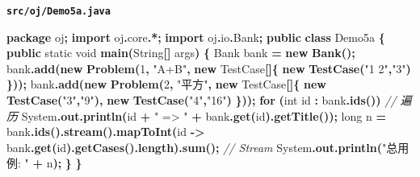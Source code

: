 \documentclass[
  11pt,
]{ctexart}
\newenvironment{Shaded}{\begin{snugshade}}{\end{snugshade}}
\newcommand{\BuiltInTok}[1]{#1}
\newcommand{\CommentTok}[1]{\textcolor[rgb]{0.56,0.35,0.01}{\textit{#1}}}
\newcommand{\ControlFlowTok}[1]{\textcolor[rgb]{0.13,0.29,0.53}{\textbf{#1}}}
\newcommand{\DataTypeTok}[1]{\textcolor[rgb]{0.13,0.29,0.53}{#1}}
\newcommand{\DecValTok}[1]{\textcolor[rgb]{0.00,0.00,0.81}{#1}}
\newcommand{\FunctionTok}[1]{\textcolor[rgb]{0.13,0.29,0.53}{\textbf{#1}}}
\newcommand{\ImportTok}[1]{#1}
\newcommand{\KeywordTok}[1]{\textcolor[rgb]{0.13,0.29,0.53}{\textbf{#1}}}
\newcommand{\NormalTok}[1]{#1}
\newcommand{\OperatorTok}[1]{\textcolor[rgb]{0.81,0.36,0.00}{\textbf{#1}}}
\newcommand{\StringTok}[1]{\textcolor[rgb]{0.31,0.60,0.02}{#1}}
\begin{document}
\textbf{\texttt{src/oj/Demo5a.java}}

\begin{Shaded}
\begin{Highlighting}[]
\KeywordTok{package}\ImportTok{ oj}\OperatorTok{;}
\KeywordTok{import} \ImportTok{oj}\OperatorTok{.}\ImportTok{core}\OperatorTok{.*;}
\KeywordTok{import} \ImportTok{oj}\OperatorTok{.}\ImportTok{io}\OperatorTok{.}\ImportTok{Bank}\OperatorTok{;}
\KeywordTok{public} \KeywordTok{class}\NormalTok{ Demo5a }\OperatorTok{\{}
    \KeywordTok{public} \DataTypeTok{static} \DataTypeTok{void} \FunctionTok{main}\OperatorTok{(}\BuiltInTok{String}\OperatorTok{[]}\NormalTok{ args}\OperatorTok{)} \OperatorTok{\{}
\NormalTok{        Bank bank }\OperatorTok{=} \KeywordTok{new} \FunctionTok{Bank}\OperatorTok{();}
\NormalTok{        bank}\OperatorTok{.}\FunctionTok{add}\OperatorTok{(}\KeywordTok{new} \FunctionTok{Problem}\OperatorTok{(}\DecValTok{1}\OperatorTok{,} \StringTok{"A+B"}\OperatorTok{,} \KeywordTok{new}\NormalTok{ TestCase}\OperatorTok{[]\{} \KeywordTok{new} \FunctionTok{TestCase}\OperatorTok{(}\StringTok{"1 2"}\OperatorTok{,}\StringTok{"3"}\OperatorTok{)} \OperatorTok{\}));}
\NormalTok{        bank}\OperatorTok{.}\FunctionTok{add}\OperatorTok{(}\KeywordTok{new} \FunctionTok{Problem}\OperatorTok{(}\DecValTok{2}\OperatorTok{,} \StringTok{"平方"}\OperatorTok{,} \KeywordTok{new}\NormalTok{ TestCase}\OperatorTok{[]\{} \KeywordTok{new} \FunctionTok{TestCase}\OperatorTok{(}\StringTok{"3"}\OperatorTok{,}\StringTok{"9"}\OperatorTok{),} \KeywordTok{new} \FunctionTok{TestCase}\OperatorTok{(}\StringTok{"4"}\OperatorTok{,}\StringTok{"16"}\OperatorTok{)} \OperatorTok{\}));}
        \ControlFlowTok{for} \OperatorTok{(}\DataTypeTok{int}\NormalTok{ id }\OperatorTok{:}\NormalTok{ bank}\OperatorTok{.}\FunctionTok{ids}\OperatorTok{())}                                       \CommentTok{// 遍历}
            \BuiltInTok{System}\OperatorTok{.}\FunctionTok{out}\OperatorTok{.}\FunctionTok{println}\OperatorTok{(}\NormalTok{id }\OperatorTok{+} \StringTok{" =\textgreater{} "} \OperatorTok{+}\NormalTok{ bank}\OperatorTok{.}\FunctionTok{get}\OperatorTok{(}\NormalTok{id}\OperatorTok{).}\FunctionTok{getTitle}\OperatorTok{());}
        \DataTypeTok{long}\NormalTok{ n }\OperatorTok{=}\NormalTok{ bank}\OperatorTok{.}\FunctionTok{ids}\OperatorTok{().}\FunctionTok{stream}\OperatorTok{().}\FunctionTok{mapToInt}\OperatorTok{(}\NormalTok{id }\OperatorTok{{-}\textgreater{}}\NormalTok{ bank}\OperatorTok{.}\FunctionTok{get}\OperatorTok{(}\NormalTok{id}\OperatorTok{).}\FunctionTok{getCases}\OperatorTok{().}\FunctionTok{length}\OperatorTok{).}\FunctionTok{sum}\OperatorTok{();}  \CommentTok{// Stream}
        \BuiltInTok{System}\OperatorTok{.}\FunctionTok{out}\OperatorTok{.}\FunctionTok{println}\OperatorTok{(}\StringTok{"总用例: "} \OperatorTok{+}\NormalTok{ n}\OperatorTok{);}
    \OperatorTok{\}}
\OperatorTok{\}}
\end{Highlighting}
\end{Shaded}
\end{document}
